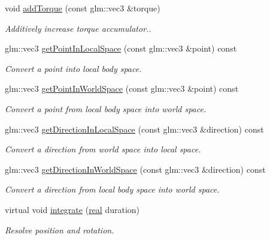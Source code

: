 \begin{DoxyCompactItemize}
void \mbox{\hyperlink{classr3_1_1_rigid_body_a276ac614e4eab3df963d64401112bd36}{add\+Torque}} (const glm\+::vec3 \&torque)
\begin{DoxyCompactList}\small\item\em Additively increase torque accumulator.. \end{DoxyCompactList}\item 
glm\+::vec3 \mbox{\hyperlink{classr3_1_1_rigid_body_a23b72178cb04117c3b016218fefff835}{get\+Point\+In\+Local\+Space}} (const glm\+::vec3 \&point) const
\begin{DoxyCompactList}\small\item\em Convert a point into local body space. \end{DoxyCompactList}\item 
glm\+::vec3 \mbox{\hyperlink{classr3_1_1_rigid_body_a1d694ab55e5846af2d5a184b2be4c523}{get\+Point\+In\+World\+Space}} (const glm\+::vec3 \&point) const
\begin{DoxyCompactList}\small\item\em Convert a point from local body space into world space. \end{DoxyCompactList}\item 
glm\+::vec3 \mbox{\hyperlink{classr3_1_1_rigid_body_a621796b0cd49499e10b158096ae5c938}{get\+Direction\+In\+Local\+Space}} (const glm\+::vec3 \&direction) const
\begin{DoxyCompactList}\small\item\em Convert a direction from world space into local space. \end{DoxyCompactList}\item 
glm\+::vec3 \mbox{\hyperlink{classr3_1_1_rigid_body_aa51f55f7c344d1d7754b91b565cb6eac}{get\+Direction\+In\+World\+Space}} (const glm\+::vec3 \&direction) const
\begin{DoxyCompactList}\small\item\em Convert a direction from local body space into world space. \end{DoxyCompactList}\item 
virtual void \mbox{\hyperlink{classr3_1_1_rigid_body_a16fd97f28e3d1c2308feb1c2e6b2e1f0}{integrate}} (\mbox{\hyperlink{namespacer3_ab2016b3e3f743fb735afce242f0dc1eb}{real}} duration)
\begin{DoxyCompactList}\small\item\em Resolve position and rotation. \end{DoxyCompactList}\end{DoxyCompactItemize}
